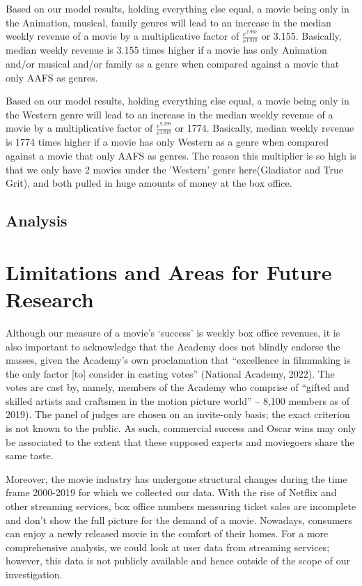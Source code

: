 \documentclass[11pt]{article} %
\begin{document}
Based on our model results, holding everything else equal, a movie being only in the Animation, musical, family  genres will lead to an increase in the median weekly revenue of a movie by a multiplicative factor of $\frac{e^{2.967}}{e^{1.818}}$ or 3.155. Basically, median weekly revenue is 3.155 times  higher if a movie has only Animation and/or musical and/or family as a genre when compared against a movie that only AAFS as genres.

Based on our model results, holding everything else equal, a movie being only in the Western genre will lead to an increase in the median weekly revenue of a movie by a multiplicative factor of $\frac{e^{9.299}}{e^{1.818}}$ or 1774. Basically, median weekly revenue is 1774 times  higher if a movie has only Western as a genre when compared against a movie that only AAFS as genres. The reason this multiplier is so high is that we only have 2 movies under the 'Western' genre here(Gladiator and True Grit), and both pulled in huge amounts of money at the box office.

\subsection{Analysis}




\section{Limitations and Areas for Future Research}
Although our measure of a movie’s ‘success’ is weekly box office revenues, it is also important to acknowledge that the Academy does not blindly endorse the masses, given the Academy’s own proclamation that “excellence in filmmaking is the only factor [to] consider in casting votes” (National Academy, 2022). The votes are cast by, namely, members of the Academy who comprise of “gifted and skilled artists and craftsmen in the motion picture world” -- 8,100 members as of 2019). The panel of judges are chosen on an invite-only basis; the exact criterion is not known to the public. As such, commercial success and Oscar wins may only be associated to the extent that these supposed experts and moviegoers share the same taste. 

Moreover, the movie industry has undergone structural changes during the time frame 2000-2019 for which we collected our data. With the rise of Netflix and other streaming services, box office numbers measuring ticket sales are incomplete and don't show the full picture for the demand of a movie. Nowadays, consumers can enjoy a newly released movie in the comfort of their homes. For a more comprehensive analysis, we could look at user data from streaming services; however, this data is not publicly available and hence outside of the scope of our investigation. 
\end{document}

